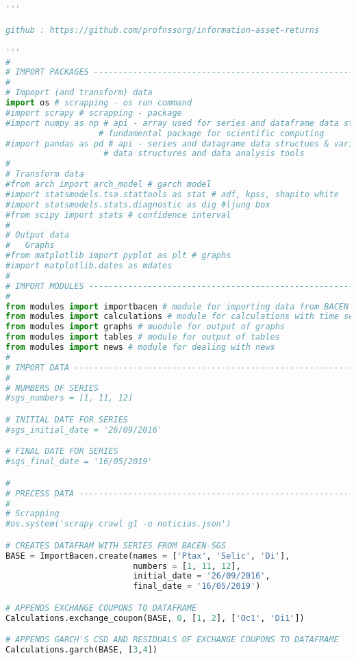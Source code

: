 \begin{lstlisting}[language=Python]

'''

github : https://github.com/profnssorg/information-asset-returns

'''
#
# IMPORT PACKAGES --------------------------------------------------------------
#
# Impoprt (and transform) data
import os # scrapping - os run command
#import scrapy # scrapping - package
#import numpy as np # api - array used for series and dataframe data structures
                   # fundamental package for scientific computing
#import pandas as pd # api - series and datagrame data structues & various 
                    # data structures and data analysis tools
#
# Transform data
#from arch import arch_model # garch model
#import statsmodels.tsa.stattools as stat # adf, kpss, shapito white
#import statsmodels.stats.diagnostic as dig #ljung box
#from scipy import stats # confidence interval
#
# Output data
#	Graphs
#from matplotlib import pyplot as plt # graphs
#import matplotlib.dates as mdates
#
# IMPORT MODULES ---------------------------------------------------------------
#
from modules import importbacen # module for importing data from BACEN SGS
from modules import calculations # module for calculations with time series
from modules import graphs # muodule for output of graphs
from modules import tables # module for output of tables
from modules import news # module for dealing with news
#
# IMPORT DATA ------------------------------------------------------------------
#
# NUMBERS OF SERIES
#sgs_numbers = [1, 11, 12]

# INITIAL DATE FOR SERIES
#sgs_initial_date = '26/09/2016'

# FINAL DATE FOR SERIES
#sgs_final_date = '16/05/2019'

#
# PRECESS DATA -----------------------------------------------------------------
#
# Scrapping
#os.system('scrapy crawl g1 -o noticias.json')

# CREATES DATAFRAM WITH SERIES FROM BACEN-SGS
BASE = ImportBacen.create(names = ['Ptax', 'Selic', 'Di'],
                          numbers = [1, 11, 12],
                          initial_date = '26/09/2016',
                          final_date = '16/05/2019')

# APPENDS EXCHANGE COUPONS TO DATAFRAME
Calculations.exchange_coupon(BASE, 0, [1, 2], ['Oc1', 'Di1'])

# APPENDS GARCH'S CSD AND RESIDUALS OF EXCHANGE COUPONS TO DATAFRAME
Calculations.garch(BASE, [3,4])


\end{lstlisting}
